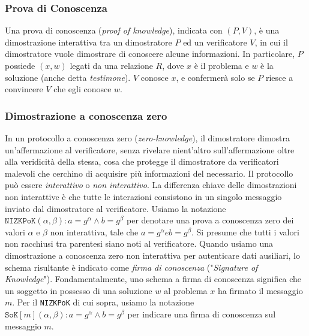 \subsubsection{Prova di Conoscenza}
Una prova di conoscenza (\emph{proof of knowledge}), indicata con $(P, V)$, è una dimostrazione interattiva tra un dimostratore $P$ ed un verificatore $V$, in cui il dimostratore vuole dimostrare di conoscere alcune informazioni. In particolare, $P$ possiede $(x, w)$ legati da una relazione $R$, dove $x$ è il problema e $w$ è la soluzione (anche detta \emph{testimone}). $V$ conosce $x$, e confermerà solo se $P$ riesce a convincere $V$ che egli conosce $w$.

\subsubsection{Dimostrazione a conoscenza zero}
In un protocollo a conoscenza zero (\emph{zero-knowledge}), il dimostratore dimostra un'affermazione al verificatore, senza rivelare nient'altro sull'affermazione oltre alla veridicità della stessa, cosa che protegge il dimostratore da verificatori malevoli che cerchino di acquisire più informazioni del necessario. Il protocollo può essere \emph{interattivo} o \emph{non interattivo}. La differenza chiave delle dimostrazioni non interattive è che tutte le interazioni consistono in un singolo messaggio inviato dal dimostratore al verificatore. Usiamo la notazione $\texttt{NIZKPoK}(\alpha, \beta): a = g^{\alpha} \wedge b = g^{\beta}$ per denotare una prova a conoscenza zero dei valori $\alpha$ e $\beta$ non interattiva, tale che $a = g^{\alpha} e b = g^{\beta}$. Si presume che tutti i valori non racchiusi tra parentesi siano noti al verificatore. Quando usiamo una dimostrazione a conoscenza zero non interattiva per autenticare dati ausiliari, lo schema risultante è indicato come \emph{firma di conoscenza} ("\emph{Signature of Knowledge}")\cite{c8}. Fondamentalmente, uno schema a firma di conoscenza significa che un soggetto in possesso di una soluzione $w$ al problema $x$ ha firmato il messaggio $m$. Per il \texttt{NIZKPoK} di cui sopra, usiamo la notazione $\texttt{SoK}[m](\alpha, \beta): a = g^{\alpha} \wedge b = g^{\beta}$ per indicare una firma di conoscenza sul messaggio $m$.

